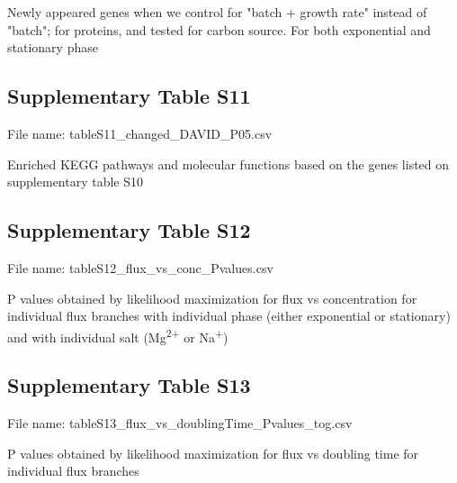 \documentclass[a4paper]{article}
\begin{document}
Newly appeared genes when we control for "batch + growth rate" instead of "batch"; for proteins, and tested for carbon source. For both exponential and stationary phase

\subsection*{Supplementary Table S11}
File name: tableS11\_changed\_DAVID\_P05.csv

Enriched KEGG pathways and molecular functions based on the genes listed on supplementary table S10

\subsection*{Supplementary Table S12}
File name: tableS12\_flux\_vs\_conc\_Pvalues.csv

P values obtained by likelihood maximization for flux vs concentration for individual flux branches with individual phase (either exponential or stationary) and with individual salt (Mg\textsuperscript{2+} or Na\textsuperscript{+}) 

\subsection*{Supplementary Table S13}
File name: tableS13\_flux\_vs\_doublingTime\_Pvalues\_tog.csv

P values obtained by likelihood maximization for flux vs doubling time for individual flux branches
\end{document}
